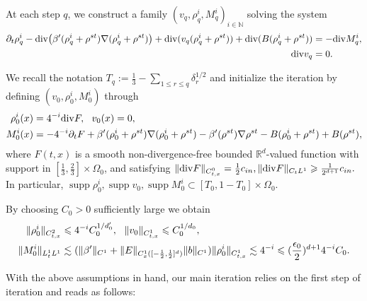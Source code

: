 \documentclass[UTF-8,reqno]{amsart}
\numberwithin{equation}{section}
\theoremstyle{definition}
\DeclareMathOperator{\supp}{supp}
\def\mR{{\mathbb R}}
\def\geq{\geqslant}
\def\leq{\leqslant}
\def\div{\mathord{{\rm div}}}
\def\geq{\geqslant}
\def\leq{\leqslant}
\def\div{\mathord{{\rm div}}}
\begin{document}
At each step $q$, we construct a family
$(v_q,\rho_q^i,M_q^i)_{i\in\mathbb{N}}$
solving the system
\begin{align}\label{R:eq:4qth}
\partial_t\rho_q^i
-
\div \bigl(\beta'(\rho_q^i+\rho^{st})\nabla(\rho_q^i+\rho^{st})\bigr)
+
\div(v_q(\rho_q^i+\rho^{st}))+\div(B(\rho_q^i+\rho^{st}))
&=
-\div M_q^i,
\\
\div v_q&=0.
\notag
\end{align}

 We recall the notation $
T_q:=\frac13-\sum_{1\leq r\leq q}\delta_r^{1/2}
$ and initialize the iteration by defining
$
(v_0,\rho^i_0,M^i_0)
$
through
\begin{align*}
\rho^i_0(x)
&=
 4^{-i}\div F,
\ \
v_0(x)=0,
\\ 
M^i_0(x)
&=-4^{-i}\partial_t F+\beta'(\rho_0^i+\rho^{st})\nabla(\rho_0^i+\rho^{st})-\beta'(\rho^{st})\nabla\rho^{st}
-B(\rho_0^i+\rho^{st})+B( \rho^{st}),
\end{align*}
where
$  F(t,x)$ is a smooth non-divergence-free bounded $\mR^d$-valued function with support in $[\frac13,\frac23]\times \Omega_0$, and satisfying $\|\div F\|_{C_{t,x}^0}=\frac1 2 c_{in}, \|\div F\|_{C_tL^1}\geq \frac1 {2^{d+1}} c_{in}.$ In particular, $\supp\rho_0^i,\supp v_0,\supp M_0^i\subset [T_0,1-T_0]\times \Omega_0$. 
 
  By choosing $C_0>0$ sufficiently large we obtain  
\begin{align}
\| \rho_0^i\|_{C_{t,x}^2}
& 
\leq
4^{-i}C_0^{1/d_0'},\ \ \|v_0\|_{C_{t,x}^1}\leq C_0^{1/d_0},
\notag\\
\|M_0^i\|_{L_t^1L^1}
&\lesssim  (\|\beta' \|_{C^1 }+\|E \|_{C_{x}^1([-\frac12,\frac12]^d)}\|b\|_{C^1})\|\rho_0^i\|_{C_{t,x}^1}\lesssim 
4^{-i}
\leq
(\frac{\epsilon_0}{2})^{d+1}4^{-i}C_0.
\label{R:bd:4rho_0,M_0}
\end{align} 

 

With the above assumptions in hand, our main iteration relies on the first step of iteration and reads as follows:
\end{document}

